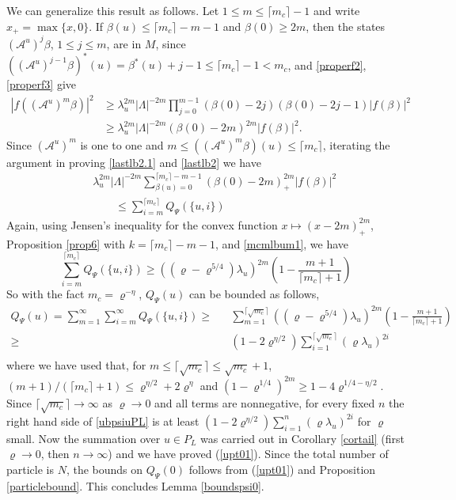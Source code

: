 \documentclass[11pt]{article}
\numberwithin{equation}{section}
\newcommand{\e}{\varepsilon}
\newcommand{\beq}{\begin{equation}}
\newcommand{\eeq}{\end{equation}}
\newcommand{\beqa}{\begin{eqnarray}}
\newcommand{\eeqa}{\end{eqnarray}}
\newcommand\eps{\varepsilon}
\newcommand\be{\beta}
\renewcommand\rho\varrho
\theoremstyle{definition}
\begin{document}
We can generalize this result as follows. Let $1\le m\leq \lceil m_c\rceil-1$ and write $x_+=\max\{x,0\}$. If $\be(u)\leq\lceil m_c\rceil-m-1$ and $\be(0)\geq 2m$, then the states $(\mathcal A^{u})^j\be$, $1\leq j\leq m$, are in $M$, since $\left((\mathcal A^{u})^{j-1}\be\right)^*(u)=\be^*(u)+j-1\leq\lceil m_c\rceil-1<m_c$, and \eqref{properf2}, \eqref{properf3} give
\begin{align*}
|f((\mathcal A^{u})^m\be)|^2&\geq\lambda_u^{2m}|\Lambda|^{-2m}\prod_{j=0}^{m-1}\left(\be(0)-2j\right)\left(\be(0)-2j-1\right)|f(\be)|^2\\
&\geq \lambda_u^{2m}|\Lambda|^{-2m}\left(\be(0)-2m\right)^{2m}|f(\be)|^2 .
\end{align*}
Since $(\mathcal A^{u})^m$ is one to one and $m\leq ((\mathcal A^{u})^m\be)(u)\leq\lceil m_c\rceil$, iterating the argument in proving  \eqref{lastlb2.1}
and \eqref{lastlb2} we have 
\beqa\label{lastlb4}
&&\lambda_u^{2m}|\Lambda|^{-2m}\sum_{\be(u)=0}^{\lceil m_c\rceil-m-1}
\left(\be(0)-2m\right)_+^{2m}|f(\be)|^2 \nonumber\\
&&\qquad\le \sum_{i=m}^{\lceil m_c\rceil} Q_\Psi(\{u,i\})
\eeqa
Again, using Jensen's inequality for the convex function $x\mapsto (x-2m)_+^{2m}$, Proposition \ref{prop6} with $k=\lceil m_c\rceil-m-1$, and \eqref{mcmlbum1}, we have 
\beq
\sum_{i=m}^{\lceil m_c\rceil} Q_\Psi(\{u,i\})\geq  ((\rho-\rho^{5/4})\lambda_u)^{2m}\left(1-\frac{m+1}{\lceil m_c\rceil+1}\right)
\eeq
So with the fact $m_c=\rho^{-\eta}$, $Q_\Psi(u)$ can be bounded as follows, 
\beqa\nonumber
 Q_\Psi(u)= \sum_{m=1}^\infty\sum_{i=m}^\infty  Q_\Psi(\{u,i\})
\geq&& \sum_{ m=1}^{\lceil\sqrt{m_c}\rceil}((\rho-\rho^{5/4})\lambda_u)^{2m}\left(1-\frac{m+1}{\lceil m_c\rceil+1}\right)\\\label{ubpsiuPL}
\ge&&(1-2\rho^{\eta/2})  \sum_{i=1}^{\lceil\sqrt{m_c}\rceil}(\rho\lambda_u)^{2i}\\\nonumber
\eeqa
where we have used that, for $m\leq\lceil\sqrt{m_c}\rceil\leq\sqrt{m_c}+1$, $(m+1)/(\lceil m_c\rceil+1)\leq\rho^{\eta/2}+2\rho^{\eta}$ and $(1-\rho^{1/4})^{2m}\geq 1-4\rho^{1/4-\eta/2}$. 
Since $\lceil\sqrt{m_c}\rceil\to\infty$ as $\rho\to0$ and all terms are nonnegative, for every fixed $n$ the right hand side of \eqref{ubpsiuPL} is at least $(1-2\rho^{\eta/2})\sum_{i=1}^{n}(\rho\lambda_u)^{2i}$ for $\rho$ small. 
Now the summation  over $u \in P_{L}$ was carried out in Corollary \ref{cortail} (first $\rho\to0$, then $n\to\infty$)
and  we have proved   (\ref{upt01}).  Since the total number of particle is $N$, 
the  bounds on $Q_\Psi(0)$ follows from (\ref{upt01}) and Proposition \ref{particlebound}. 
This concludes Lemma \ref{boundspsi0}. 
\end{document}
